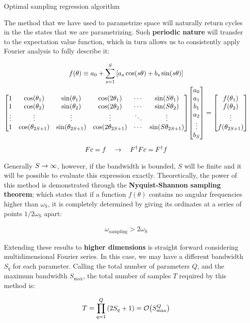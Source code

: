 \documentclass[9pt, handout, aspectratio=169]{beamer}	%
\begin{document}
\begin{frame}[allowframebreaks]{Optimal sampling regression algorithm}

	The method that we have used to parametrize space will naturally return cycles in the the states that we are parametrizing. Such \textbf{periodic nature} will transfer to the expectation value function, which in turn allows us to consistently apply Fourier analysis to fully describe it:

	\begin{gather*}
	  f(\theta) \equiv a_0 + \sum_{s=1}^S \qty[a_s\cos(s\theta) + b_s\sin(s\theta)] \\
	  \mqty[
	    1 & \cos(\theta_1) & \sin(\theta_1) & \cos(2\theta_1)
	      & \cdots & \sin(S\theta_1) \\
	    1 & \cos(\theta_2) & \sin(\theta_2) & \cos(2\theta_2)
	      & \cdots & \sin(S\theta_2) \\
	    \vdots & \vdots & \vdots & \vdots & \ddots & \vdots \\
	    1 & \cos(\theta_{2S+1}) & \sin(\theta_{2S+1}) & \cos(2\theta_{2S+1})
	      & \cdots & \sin(S\theta_{2S+1})
	  ]
	  \mqty[
	    a_0 \\ a_1 \\ b_1 \\ a_2 \\ \vdots \\ b_S
	  ] =
	  \mqty[
	    f(\theta_1) \\ f(\theta_2) \\ \vdots \\ f(\theta_{2S+1})
	  ] \\[5pt]
	  Fc = f \qra F^{\dagger}Fc = F^{\dagger}f
	\end{gather*}

\break

	Generally $S \rightarrow \infty$, however, if the bandwidth is bounded, $S$ will be finite and it will be possible to evaluate this expression exactly. Theoretically, the power of this method is demonstrated through the \textbf{Nyquist-Shannon sampling theorem}; which states that if a function $f(\theta)$ contains no angular frequencies higher than $\omega_{\text{S}}$, it is completely determined by giving its ordinates at a series of points $1/2\omega_{\text{S}}$ apart:

	\begin{gather*}
	  \omega_{\text{sampling}} > 2\omega_{\text{S}}
	\end{gather*}

	Extending these results to \textbf{higher dimensions} is straight forward considering multidimensional Fourier series. In this case, we may have a different bandwidth $S_{q}$ for each parameter. Calling the total number of parameters $Q$, and the maximum bandwidth $S_{\text{max}}$, the total number of samples $T$ required by this method is:

	\begin{gather*}
	  T = \prod_{q=1}^{Q} \qty(2 S_{q} + 1) = \order{S_{\text{max}}^{Q}}
	\end{gather*}

\end{frame}

\end{document}
